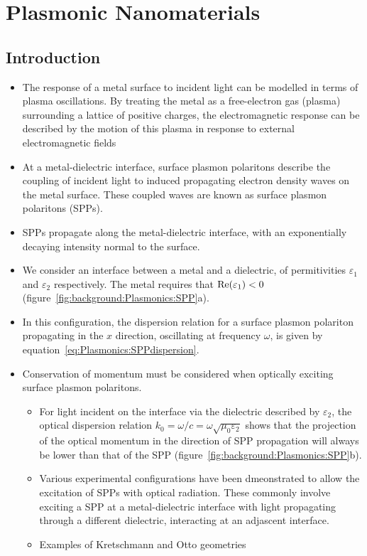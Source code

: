 \chapter{Plasmonic Nanomaterials}\label{sec:background:Plasmonics}

\section{Introduction}
\begin{itemize}
    \item The response of a metal surface to incident light can be modelled in terms of plasma oscillations. By treating the metal as a free-electron gas (plasma) surrounding a lattice of positive charges, the electromagnetic response can be described by the motion of this plasma in response to external electromagnetic fields
    \item At a metal-dielectric interface, surface plasmon polaritons describe the coupling of incident light to induced propagating electron density waves on the metal surface. These coupled waves are known as surface plasmon polaritons (SPPs).
    \item SPPs propagate along the metal-dielectric interface, with an exponentially decaying intensity normal to the surface.
    \item We consider an interface between a metal and a dielectric, of permitivities $\varepsilon_1$ and $\varepsilon_2$ respectively. The metal requires that ${\mathop{\rm Re}\nolimits}(\varepsilon_1)<0$ (figure~\ref{fig:background:Plasmonics:SPP}a).
    \item In this configuration, the dispersion relation for a surface plasmon polariton propagating in the $x$ direction, oscillating at frequency $\omega$, is given by equation~\ref{eq:Plasmonics:SPPdispersion}.
    \item Conservation of momentum must be considered when optically exciting surface plasmon polaritons.
    \begin{itemize}
        \item For light incident on the interface via the dielectric described by $\varepsilon_2$, the optical dispersion relation $k_0 = \omega / c = \omega \sqrt{\mu_0 \varepsilon_2}$ shows that the projection of the optical momentum in the direction of SPP propagation will always be lower than that of the SPP (figure~\ref{fig:background:Plasmonics:SPP}b).
        \item Various experimental configurations have been dmeonstrated to allow the excitation of SPPs with optical radiation. These commonly involve exciting a SPP at a metal-dielectric interface with light propagating through a different dielectric, interacting at an adjascent interface.
        \item Examples of Kretschmann and Otto geometries
    \end{itemize}
\end{itemize}

